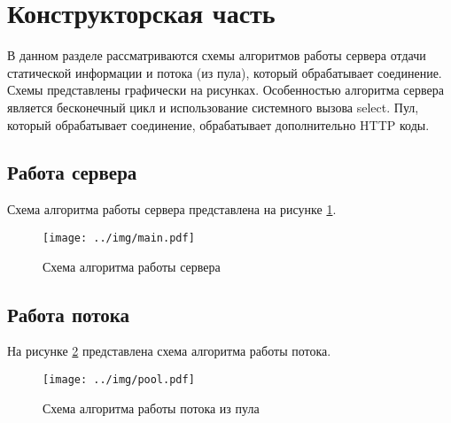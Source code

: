 \section{Конструкторская часть}

В данном разделе рассматриваются схемы алгоритмов работы сервера отдачи статической информации и потока (из пула), который обрабатывает соединение.
Схемы представлены графически на рисунках.
Особенностью алгоритма сервера является бесконечный цикл и использование системного вызова select.
Пул, который обрабатывает соединение, обрабатывает дополнительно HTTP коды.

\subsection{Работа сервера}

Схема алгоритма работы сервера представлена на рисунке \ref{img:main}.

\begin{figure}[!htb]\centering
	\texttt{[image: ../img/main.pdf]}
	\caption{Схема алгоритма работы сервера}
	\label{img:main}
\end{figure}

\newpage

\subsection{Работа потока}

На рисунке \ref{img:pool} представлена схема алгоритма работы потока.

\begin{figure}[!htb]\centering
	\texttt{[image: ../img/pool.pdf]}
	\caption{Схема алгоритма работы потока из пула}
	\label{img:pool}
\end{figure}